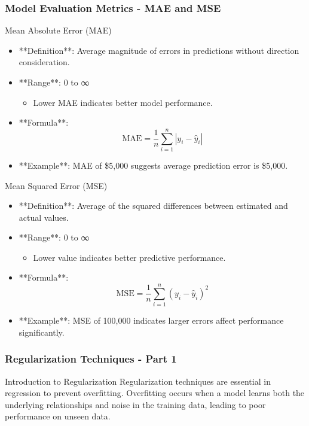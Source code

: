 \documentclass[aspectratio=169]{beamer}
\begin{document}
\begin{frame}[fragile]
  \frametitle{Model Evaluation Metrics - MAE and MSE}
  \begin{block}{Mean Absolute Error (MAE)}
    \begin{itemize}
      \item **Definition**: Average magnitude of errors in predictions without direction consideration.
      \item **Range**: 0 to ∞
      \begin{itemize}
        \item Lower MAE indicates better model performance.
      \end{itemize}
      \item **Formula**: 
      \begin{equation}
        \text{MAE} = \frac{1}{n} \sum_{i=1}^{n} | y_i - \hat{y}_i |
      \end{equation}
      \item **Example**: MAE of \$5,000 suggests average prediction error is \$5,000.
    \end{itemize}
  \end{block}
  
  \begin{block}{Mean Squared Error (MSE)}
    \begin{itemize}
      \item **Definition**: Average of the squared differences between estimated and actual values.
      \item **Range**: 0 to ∞
      \begin{itemize}
        \item Lower value indicates better predictive performance.
      \end{itemize}
      \item **Formula**: 
      \begin{equation}
        \text{MSE} = \frac{1}{n} \sum_{i=1}^{n} (y_i - \hat{y}_i)^2
      \end{equation}
      \item **Example**: MSE of 100,000 indicates larger errors affect performance significantly.
    \end{itemize}
  \end{block}
\end{frame}

\begin{frame}[fragile]
    \frametitle{Regularization Techniques - Part 1}
    \begin{block}{Introduction to Regularization}
        Regularization techniques are essential in regression to prevent overfitting. Overfitting occurs when a model learns both the underlying relationships and noise in the training data, leading to poor performance on unseen data.
    \end{block}
\end{frame}
\end{document}
